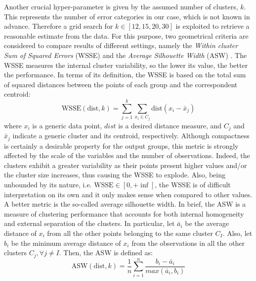 Another crucial hyper-parameter is given by the assumed number of clusters, $k$. This represents the number of error categories in our case, which is not known in advance. 
Therefore a grid search for $k \in [12, 15, 20, 30] $ is exploited to retrieve a reasonable estimate from the data.
For this purpose, two geometrical criteria are considered to compare results of different settings, namely the \textit{Within cluster Sum of Squared Errors} (WSSE) and the \textit{Average Silhouette Width} (ASW) \cite{rousseeuw1987ASW}.
The WSSE measures the internal cluster variability, so the lower its value, the better the performance.
In terms of its definition, the WSSE is based on the total sum of squared distances between the points of each group and the correspondent centroid:
\begin{equation}
    \text{WSSE}\left(\text{dist}, k\right) = 
    \sum_{j=1}^{k}{ 
    \sum_{x_i \in C_j}{\text{dist}\left( x_i - \bar{x}_j\right)} 
    }
\end{equation}
where $x_i$ is a generic data point, ${dist}$ is a desired distance measure, and $C_j$ and $\bar{x}_j$ indicate a generic cluster and its centroid, respectively.
Although compactness is certainly a desirable property for the output groups, this metric is strongly affected by the scale of the variables and the number of observations. Indeed, the clusters exhibit a greater variability as their points present higher values and/or the cluster size increases, thus causing the WSSE to explode. 
Also, being unbounded by its nature, i.e. $\text{WSSE} \in \left[ 0, +\inf \right]$, the WSSE is of difficult interpretation on its own and it only makes sense when compared to other values. \\
A better metric is the so-called average silhouette width. In brief, the ASW is a measure of clustering performance that accounts for both internal homogeneity and external separation of the clusters.
In particular, let $\bar{a}_i$ be the average distance of $x_i$ from all the other points belonging to the same cluster $C_I$. Also, let $b_i$ be the minimum average distance of $x_i$ from the observations in all the other clusters $C_j , \forall j \neq I$. Then, the ASW is defined as:
\begin{equation}
    \text{ASW}\left(\text{dist}, k\right) = 
    \dfrac{1}{n} \sum_{i=1}^{n}{ 
    \dfrac{b_i - \bar{a}_i}{ max\left( \bar{a}_i, b_i \right) }
    }
\end{equation}
